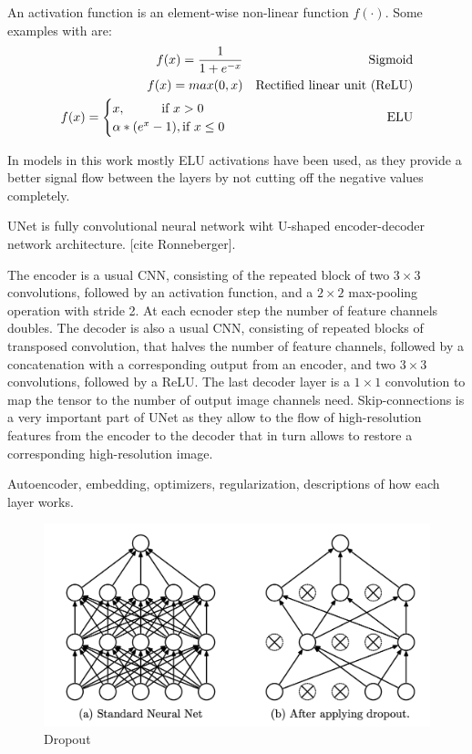 \begin{definition}
	An activation function is an element-wise non-linear function $f(\cdot)$. Some examples with are:
	\begin{align}             
		f(x) = \frac{1}{1 + e^{-x}} &&\text{Sigmoid} \\      
		f(x) = max(0, x) &&\text{Rectified linear unit (ReLU)}\\
		f(x) = \begin{cases}
				x, \hspace*{1cm} \textrm{if } x > 0 \\
				\alpha * (e^{x} - 1), \textrm{if }  x \leq 0
		  	\end{cases}\ &&\text{ELU}
		\end{align}
\end{definition}

In models in this work mostly ELU activations have been used, as they provide a better signal flow between the layers by not cutting off the negative values completely.

\begin{definition}[UNet]
	UNet is fully convolutional neural network wiht U-shaped encoder-decoder network architecture. [cite Ronneberger].
\end{definition}

The encoder is a usual CNN, consisting of the repeated
block of two $3 \times 3$ convolutions, followed by
an activation function, and a $2 \times 2$ max-pooling operation with stride 2. At each ecnoder step  the number of feature channels doubles. The decoder is also a usual CNN, consisting of repeated blocks of transposed convolution, that halves the
number of feature channels, followed by a concatenation with a corresponding output from an encoder, and two $3 \times 3$ convolutions, followed by a ReLU. The last decoder layer is a $1 \times 1$ convolution to map the tensor to the number of output image channels need. Skip-connections is a very important part of UNet as they allow to the flow of high-resolution features from the encoder to the decoder that in turn allows to restore a corresponding high-resolution image.


Autoencoder, embedding, optimizers, regularization, descriptions of how each layer works.



\begin{figure}[htb]
	\begin{center}
		\includegraphics[width=0.8\linewidth]{bilder/dropout.png}
		\caption{Dropout}\label{fig:dropout}
	\end{center}
\end{figure}